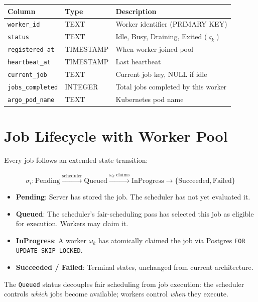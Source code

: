 \documentclass[11pt]{article}
\begin{document}
\begin{center}
\begin{tabular}{p{4.5cm}p{2.5cm}p{7cm}}
\toprule
\textbf{Column} & \textbf{Type} & \textbf{Description} \\
\midrule
\texttt{worker\_id} & TEXT & Worker identifier (PRIMARY KEY) \\
\texttt{status} & TEXT & Idle, Busy, Draining, Exited ($\varsigma_k$) \\
\texttt{registered\_at} & TIMESTAMP & When worker joined pool \\
\texttt{heartbeat\_at} & TIMESTAMP & Last heartbeat \\
\texttt{current\_job} & TEXT & Current job key, NULL if idle \\
\texttt{jobs\_completed} & INTEGER & Total jobs completed by this worker \\
\texttt{argo\_pod\_name} & TEXT & Kubernetes pod name \\
\bottomrule
\end{tabular}
\end{center}


\section{Job Lifecycle with Worker Pool}

Every job follows an extended state transition:

\begin{equation}
\sigma_i: \text{Pending}
  \xrightarrow{\text{scheduler}}  \text{Queued}
  \xrightarrow{\omega_k\text{ claims}} \text{InProgress}
  \to \{\text{Succeeded}, \text{Failed}\}
\end{equation}

\begin{itemize}
\item \textbf{Pending}: Server has stored the job. The scheduler has not yet
  evaluated it.
\item \textbf{Queued}: The scheduler's fair-scheduling pass has selected this job as
  eligible for execution. Workers may claim it.
\item \textbf{InProgress}: A worker $\omega_k$ has atomically claimed the job via
  Postgres \texttt{FOR UPDATE SKIP LOCKED}.
\item \textbf{Succeeded / Failed}: Terminal states, unchanged from current
  architecture.
\end{itemize}

The \texttt{Queued} status decouples fair scheduling from job execution: the scheduler
controls \emph{which} jobs become available; workers control \emph{when} they execute.
\end{document}

